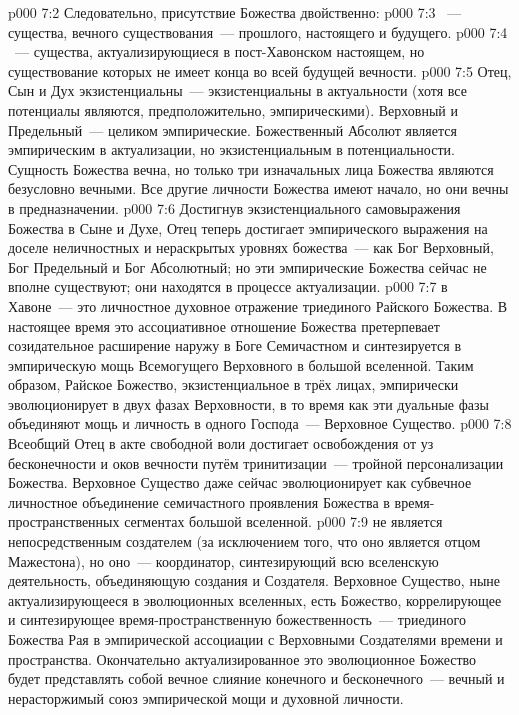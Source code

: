 \vs p000 7:2 Следовательно, присутствие Божества двойственно:
\vs p000 7:3 ~--- существа, вечного существования~--- прошлого, настоящего и будущего.
\vs p000 7:4 ~--- существа, актуализирующиеся в пост\hyp{}Хавонском настоящем, но существование которых не имеет конца во всей будущей вечности.
\vs p000 7:5 \pc Отец, Сын и Дух экзистенциальны~--- экзистенциальны в актуальности (хотя все потенциалы являются, предположительно, эмпирическими). Верховный и Предельный~--- целиком эмпирические. Божественный Абсолют является эмпирическим в актуализации, но экзистенциальным в потенциальности. Сущность Божества вечна, но только три изначальных лица Божества являются безусловно вечными. Все другие личности Божества имеют начало, но они вечны в предназначении.
\vs p000 7:6 Достигнув экзистенциального самовыражения Божества в Сыне и Духе, Отец теперь достигает эмпирического выражения на доселе неличностных и нераскрытых уровнях божества~--- как Бог Верховный, Бог Предельный и Бог Абсолютный; но эти эмпирические Божества сейчас не вполне существуют; они находятся в процессе актуализации.
\vs p000 7:7 \pc {} в Хавоне~--- это личностное духовное отражение триединого Райского Божества. В настоящее время это ассоциативное отношение Божества претерпевает созидательное расширение наружу в Боге Семичастном и синтезируется в эмпирическую мощь Всемогущего Верховного в большой вселенной. Таким образом, Райское Божество, экзистенциальное в трёх лицах, эмпирически эволюционирует в двух фазах Верховности, в то время как эти дуальные фазы объединяют мощь и личность в одного Господа~--- Верховное Существо.
\vs p000 7:8 Всеобщий Отец в акте свободной воли достигает освобождения от уз бесконечности и оков вечности путём тринитизации~--- тройной персонализации Божества. Верховное Существо даже сейчас эволюционирует как субвечное личностное объединение семичастного проявления Божества в время\hyp{}пространственных сегментах большой вселенной.
\vs p000 7:9 \pc {} не является непосредственным создателем (за исключением того, что оно является отцом Мажестона), но оно~--- координатор, синтезирующий всю вселенскую деятельность, объединяющую создания и Создателя. Верховное Существо, ныне актуализирующееся в эволюционных вселенных, есть Божество, коррелирующее и синтезирующее время\hyp{}пространственную божественность~--- триединого Божества Рая в эмпирической ассоциации с Верховными Создателями времени и пространства. Окончательно актуализированное это эволюционное Божество будет представлять собой вечное слияние конечного и бесконечного~--- вечный и нерасторжимый союз эмпирической мощи и духовной личности.

